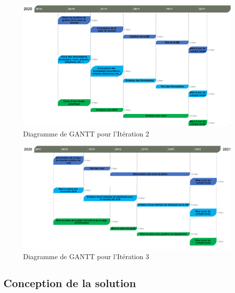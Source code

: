 \documentclass[a4paper,11pt]{article}
\begin{document}
\begin{figure}[H]
  \includegraphics[width=\linewidth]{images/gantt-iteration2.png}
  \caption{Diagramme de GANTT pour l'Itération 2}
  \label{fig:gantt-iteration2}
\end{figure}

\begin{figure}[H]
  \includegraphics[width=\linewidth]{images/gantt-iteration3.png}
  \caption{Diagramme de GANTT pour l'Itération 3}
  \label{fig:gantt-iteration3}
\end{figure}

\subsection{Conception de la solution}
\end{document}
